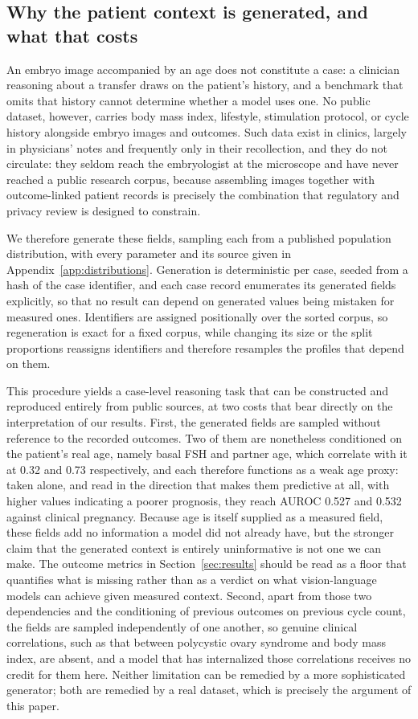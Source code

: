 \documentclass[11pt]{article}
\begin{document}
\subsection{Why the patient context is generated, and what that costs}
\label{sec:synthetic}

An embryo image accompanied by an age does not constitute a case: a clinician
reasoning about a transfer draws on the patient's history, and a benchmark that
omits that history cannot determine whether a model uses one. No public dataset,
however, carries body mass index, lifestyle, stimulation protocol, or cycle
history alongside embryo images and outcomes. Such data exist in clinics, largely
in physicians' notes and frequently only in their recollection, and they do not
circulate: they seldom reach the embryologist at the microscope and have never
reached a public research corpus, because assembling images together with
outcome-linked patient records is precisely the combination that regulatory and
privacy review is designed to constrain.

We therefore generate these fields, sampling each from a published population
distribution, with every parameter and its source given in
Appendix~\ref{app:distributions}. Generation is deterministic per case, seeded
from a hash of the case identifier, and each case record enumerates its generated
fields explicitly, so that no result can depend on generated values being
mistaken for measured ones. Identifiers are assigned positionally over the sorted
corpus, so regeneration is exact for a fixed corpus, while changing its size or
the split proportions reassigns identifiers and therefore resamples the profiles
that depend on them.

This procedure yields a case-level reasoning task that can be constructed and
reproduced entirely from public sources, at two costs that bear directly on the
interpretation of our results. First, the generated fields are sampled without reference to the recorded
outcomes. Two of them are nonetheless conditioned on the patient's real age,
namely basal FSH and partner age, which correlate with it at 0.32 and 0.73
respectively, and each therefore functions as a weak age proxy: taken alone, and
read in the direction that makes them predictive at all, with higher values
indicating a poorer prognosis, they reach AUROC 0.527 and 0.532 against clinical
pregnancy. Because age is itself
supplied as a measured field, these fields add no information a model did not
already have, but the stronger claim that the generated context is entirely
uninformative is not one we can make. The outcome metrics in
Section~\ref{sec:results} should be read as a floor that quantifies what is
missing rather than as a verdict on what vision-language models can achieve given
measured context. Second, apart from those two dependencies and the conditioning
of previous outcomes on previous cycle count, the fields are sampled
independently of one another, so genuine clinical correlations, such as that
between polycystic ovary syndrome and body mass index, are absent, and a model
that has internalized those correlations receives no credit for them here.
Neither limitation can be remedied by a more sophisticated generator; both are
remedied by a real dataset, which is precisely the argument of this paper.
\end{document}
